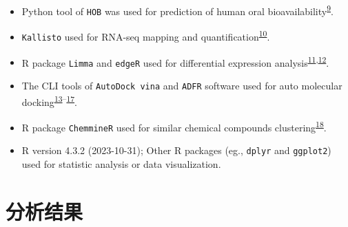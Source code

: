 \documentclass[
]{article}
\begin{document}
\begin{itemize}
\item
  Python tool of \texttt{HOB} was used for prediction of human oral bioavailability\textsuperscript{\protect\hyperlink{ref-HobpreAccuratWeiM2022}{9}}.
\item
  \texttt{Kallisto} used for RNA-seq mapping and quantification\textsuperscript{\protect\hyperlink{ref-NearOptimalPrBray2016}{10}}.
\item
  R package \texttt{Limma} and \texttt{edgeR} used for differential expression analysis\textsuperscript{\protect\hyperlink{ref-LimmaPowersDiRitchi2015}{11},\protect\hyperlink{ref-EdgerDifferenChen}{12}}.
\item
  The CLI tools of \texttt{AutoDock\ vina} and \texttt{ADFR} software used for auto molecular docking\textsuperscript{\protect\hyperlink{ref-AutodockVina1Eberha2021}{13}--\protect\hyperlink{ref-AutodockfrAdvRavind2015}{17}}.
\item
  R package \texttt{ChemmineR} used for similar chemical compounds clustering\textsuperscript{\protect\hyperlink{ref-ChemminerACoCaoY2008}{18}}.
\item
  R version 4.3.2 (2023-10-31); Other R packages (eg., \texttt{dplyr} and \texttt{ggplot2}) used for statistic analysis or data visualization.
\end{itemize}

\hypertarget{results}{%
\section{分析结果}\label{results}}
\end{document}
